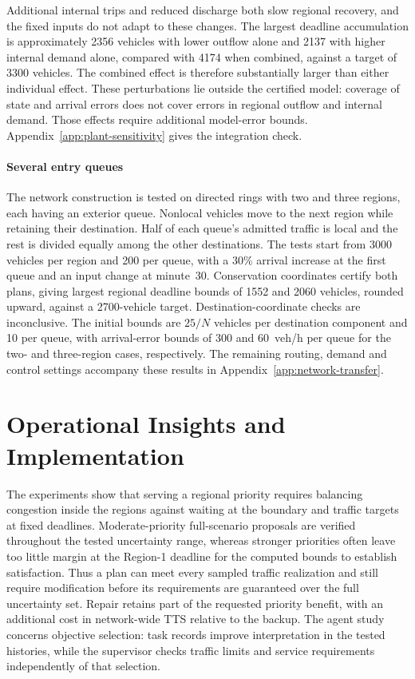 \documentclass[final]{cas-sc}
\theoremstyle{definition}
\theoremstyle{plain}
\theoremstyle{definition}
\theoremstyle{plain}
\newcommand{\appref}[1]{Appendix~\ref{#1}}
\begin{document}
Additional internal trips and reduced discharge both slow regional
recovery, and the fixed inputs do not adapt to these changes. The
largest deadline accumulation is approximately 2356 vehicles with
lower outflow alone and 2137 with higher internal demand alone, compared
with 4174 when combined, against a target of 3300 vehicles. The combined
effect is therefore substantially larger than either individual effect.
These perturbations lie outside the certified model: coverage of state
and arrival errors does not cover errors in regional outflow and
internal demand. Those effects require additional model-error bounds.
\appref{app:plant-sensitivity} gives the integration check.

\paragraph{Several entry queues}
The network construction is tested on directed rings with two and
three regions, each having an exterior queue. Nonlocal vehicles move
to the next region while retaining their destination. Half of each
queue's admitted traffic is local and the rest is divided equally
among the other destinations. The tests start from 3000 vehicles
per region and 200 per queue, with a 30\% arrival increase at the
first queue and an input change at minute~30. Conservation coordinates
certify both plans, giving largest regional deadline bounds of 1552
and 2060 vehicles, rounded upward, against a 2700-vehicle target.
Destination-coordinate checks are inconclusive. The initial bounds
are $25/N$ vehicles per destination component and 10 per queue,
with arrival-error bounds of 300 and 60~veh/h per queue for the
two- and three-region cases, respectively. The remaining routing,
demand and control settings accompany these results in
\appref{app:network-transfer}.


\section{Operational Insights and Implementation}
\label{sec:new-discussion}
\label{sec:information-model-scope}

The experiments show that serving a regional priority requires
balancing congestion inside the regions against waiting at the
boundary and traffic targets at fixed deadlines. Moderate-priority
full-scenario proposals are verified throughout the tested uncertainty
range, whereas stronger priorities often leave too little margin at
the Region-1 deadline for the computed bounds to establish satisfaction.
Thus a plan can meet every sampled traffic realization and still require
modification before its requirements are guaranteed over the full
uncertainty set. Repair retains part of the requested priority benefit,
with an additional cost in network-wide TTS relative to the backup. The agent study concerns
objective selection: task records improve interpretation in the tested
histories, while the supervisor checks traffic limits and service
requirements independently of that selection.
\end{document}
